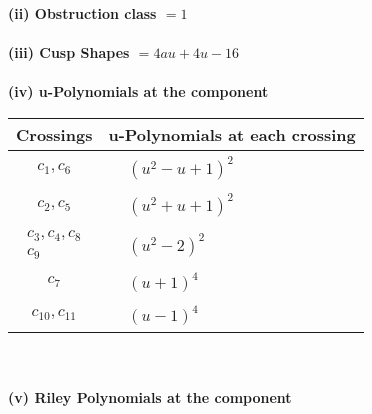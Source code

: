 \documentclass[1p]{elsarticle_modified}
\theoremstyle{definition}
\begin{document}
\flushleft \textbf{(ii) Obstruction class $= 1$}\\~\\
\flushleft \textbf{(iii) Cusp Shapes $= 4 a u+4 u-16$}\\~\\
\newpage\renewcommand{\arraystretch}{1}
\flushleft \textbf{(iv) u-Polynomials at the component}\newline \\
\begin{tabular}{m{50pt}|m{274pt}}
Crossings & \hspace{64pt}u-Polynomials at each crossing \\
\hline $$\begin{aligned}c_{1},c_{6}\end{aligned}$$&$\begin{aligned}
&(u^2- u+1)^2
\end{aligned}$\\
\hline $$\begin{aligned}c_{2},c_{5}\end{aligned}$$&$\begin{aligned}
&(u^2+u+1)^2
\end{aligned}$\\
\hline $$\begin{aligned}c_{3},c_{4},c_{8}\\c_{9}\end{aligned}$$&$\begin{aligned}
&(u^2-2)^2
\end{aligned}$\\
\hline $$\begin{aligned}c_{7}\end{aligned}$$&$\begin{aligned}
&(u+1)^4
\end{aligned}$\\
\hline $$\begin{aligned}c_{10},c_{11}\end{aligned}$$&$\begin{aligned}
&(u-1)^4
\end{aligned}$\\
\hline
\end{tabular}\\~\\
\newpage\renewcommand{\arraystretch}{1}
\flushleft \textbf{(v) Riley Polynomials at the component}\newline \\
\end{document}
